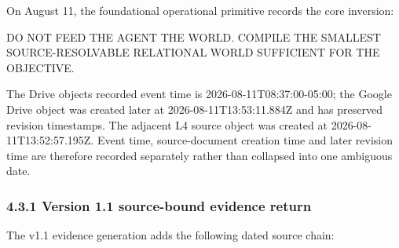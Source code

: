 \documentclass[
  10pt,
  letterpaper,
]{article}
\newenvironment{Shaded}{}{}
\newcommand{\NormalTok}[1]{#1}
\begin{document}
On August 11, the foundational operational primitive records the core
inversion:

\begin{Shaded}
\begin{Highlighting}[]
\NormalTok{DO NOT FEED THE AGENT THE WORLD.}
\NormalTok{COMPILE THE SMALLEST SOURCE{-}RESOLVABLE RELATIONAL WORLD SUFFICIENT FOR THE OBJECTIVE.}
\end{Highlighting}
\end{Shaded}

The Drive object\textquotesingle s recorded event time is
2026-08-11T08:37:00-05:00; the Google Drive object was created later at
2026-08-11T13:53:11.884Z and has preserved revision timestamps. The
adjacent L4 source object was created at 2026-08-11T13:52:57.195Z. Event
time, source-document creation time and later revision time are
therefore recorded separately rather than collapsed into one ambiguous
date.

\subsubsection{4.3.1 Version 1.1 source-bound evidence
return}\label{431-version-11-source-bound-evidence-return}

The v1.1 evidence generation adds the following dated source chain:
\end{document}
